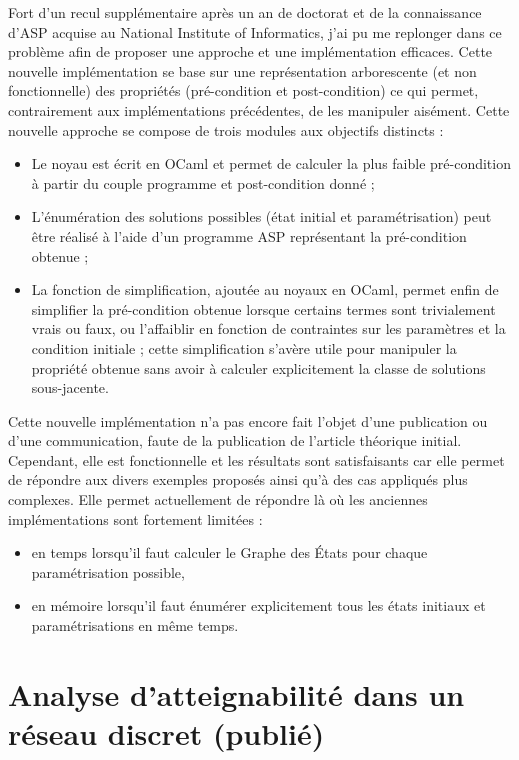 Fort d'un recul supplémentaire après un an de doctorat et de la connaissance d'ASP acquise au National Institute of Informatics, j'ai pu me replonger dans ce problème afin de proposer une approche et une implémentation efficaces.
Cette nouvelle implémentation se base sur une représentation arborescente (et non fonctionnelle) des propriétés (pré-condition et post-condition) ce qui permet, contrairement aux implémentations précédentes, de les manipuler aisément.
Cette nouvelle approche se compose de trois modules aux objectifs distincts :
\begin{itemize}
  \item Le noyau est écrit en OCaml et permet de calculer la plus faible pré-condition à partir du couple programme et post-condition donné ;
  \item L'énumération des solutions possibles (état initial et paramétrisation) peut être réalisé à l'aide d'un programme ASP représentant la pré-condition obtenue ;
  \item La fonction de simplification, ajoutée au noyaux en OCaml, permet enfin de simplifier la pré-condition obtenue lorsque certains termes sont trivialement vrais ou faux, ou l'affaiblir en fonction de contraintes sur les paramètres et la condition initiale ; cette simplification s'avère utile pour manipuler la propriété obtenue sans avoir à calculer explicitement la classe de solutions sous-jacente.
\end{itemize}

Cette nouvelle implémentation n'a pas encore fait l'objet d'une publication ou d'une communication, faute de la publication de l'article théorique initial.
Cependant, elle est fonctionnelle et les résultats sont satisfaisants car elle permet de répondre aux divers exemples proposés ainsi qu'à des cas appliqués plus complexes.
Elle permet actuellement de répondre  là où les anciennes implémentations sont fortement limitées :
\begin{itemize}
  \item en temps lorsqu'il faut calculer le Graphe des États pour chaque paramétrisation possible,
  \item en mémoire lorsqu'il faut énumérer explicitement tous les états initiaux et paramétrisations en même temps.
\end{itemize}



\section{Analyse d'atteignabilité dans un réseau discret \normalsize(publié)}
\label{sec:cs2bio}

